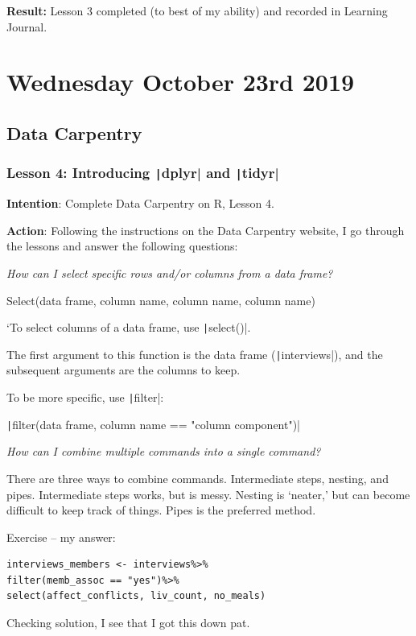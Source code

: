 \documentclass{article}
\begin{document}
\textbf{Result:} Lesson 3 completed (to best of my ability) and recorded in Learning Journal.

\section{Wednesday October 23rd 2019}

\subsection{Data Carpentry}

\subsubsection{Lesson 4: Introducing \texttt|dplyr| and \texttt|tidyr|}

\textbf{Intention}: Complete Data Carpentry on R, Lesson 4.

\textbf{Action}: Following the instructions on the Data Carpentry website, I go through the lessons and answer the following questions:

\textit{How can I select specific rows and/or columns from a data frame?}

Select(data frame, column name, column name, column name)

`To select columns of a data frame, use \texttt|select()|.

The first argument to this function is the data frame (\texttt|interviews|), and the subsequent arguments are the columns to keep.

To be more specific, use \texttt|filter|:

\texttt|filter(data frame, column name == "column component")|

\textit{How can I combine multiple commands into a single command?}

There are three ways to combine commands.
Intermediate steps, nesting, and pipes.
Intermediate steps works, but is messy.
Nesting is ‘neater,’ but can become difficult to keep track of things.
Pipes is the preferred method.

Exercise – my answer: 

\begin{verbatim}
interviews_members <- interviews%>%
filter(memb_assoc == "yes")%>%
select(affect_conflicts, liv_count, no_meals)
\end{verbatim}


{\item Checking solution, I see that I got this down pat.}
\end{document}
